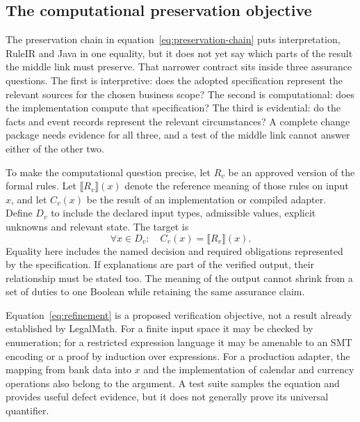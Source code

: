 \subsection{The computational preservation objective}
\label{merge:P-03-product:05}

\label{sec:proof}

The preservation chain in equation~\eqref{eq:preservation-chain} puts interpretation, RuleIR and Java in one equality, but
it does not yet say which parts of the result the middle link must preserve. That narrower
contract sits inside three assurance questions. The first is interpretive: does the adopted
specification represent the relevant sources for the chosen business scope? The second is
computational: does the implementation compute that specification? The third is evidential:
do the facts and event records represent the relevant circumstances? A complete change package needs evidence for all three, and a test of the middle link cannot answer either of the other two.

To make the computational question precise, let $R_v$ be an approved version of
the formal rules. Let $\llbracket R_v\rrbracket(x)$ denote the reference meaning
of those rules on input $x$, and let $C_v(x)$ be the result of an implementation
or compiled adapter. Define $D_v$ to include the declared input types, admissible
values, explicit unknowns and relevant state. The target is
\begin{equation}
 \forall x\in D_v:\quad C_v(x)=\llbracket R_v\rrbracket(x).
 \label{eq:refinement}
\end{equation}
Equality here includes the named decision and required obligations represented by
the specification. If explanations are part of the verified output, their
relationship must be stated too. The meaning of the output cannot shrink from a
set of duties to one Boolean while retaining the same assurance claim.


Equation~\eqref{eq:refinement} is a proposed verification objective, not a result
already established by LegalMath. For a finite input space it may be checked by
enumeration; for a restricted expression language it may be amenable to an SMT
encoding or a proof by induction over expressions. For a production adapter,
the mapping from bank data into $x$ and the implementation of calendar and
currency operations also belong to the argument. A test suite samples the
equation and provides useful defect evidence, but it does not generally prove its
universal quantifier.

